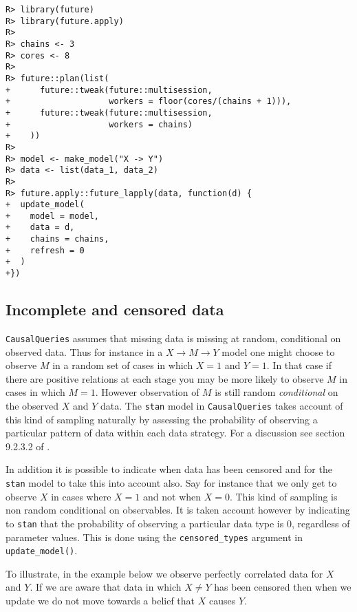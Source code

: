 \documentclass[
  11pt,
  article]{jss}
\begin{document}
\begin{verbatim}
R> library(future)
R> library(future.apply)
R> 
R> chains <- 3
R> cores <- 8
R> 
R> future::plan(list(
+      future::tweak(future::multisession, 
+                    workers = floor(cores/(chains + 1))),
+      future::tweak(future::multisession, 
+                    workers = chains)
+    ))
R> 
R> model <- make_model("X -> Y")
R> data <- list(data_1, data_2)
R> 
R> future.apply::future_lapply(data, function(d) {
+  update_model(
+    model = model,
+    data = d,
+    chains = chains,
+    refresh = 0
+  )
+})
\end{verbatim}

\hypertarget{incomplete-and-censored-data}{%
\subsection{Incomplete and censored
data}\label{incomplete-and-censored-data}}

\texttt{CausalQueries} assumes that missing data is missing at random,
conditional on observed data. Thus for instance in a
\(X \rightarrow M \rightarrow Y\) model one might choose to observe
\(M\) in a random set of cases in which \(X=1\) and \(Y=1\). In that
case if there are positive relations at each stage you may be more
likely to observe \(M\) in cases in which \(M=1\). However observation
of \(M\) is still random \emph{conditional} on the observed \(X\) and
\(Y\) data. The \texttt{stan} model in \texttt{CausalQueries} takes
account of this kind of sampling naturally by assessing the probability
of observing a particular pattern of data within each data strategy. For
a discussion see section 9.2.3.2 of \citet{ii2023}.

In addition it is possible to indicate when data has been censored and
for the \texttt{stan} model to take this into account also. Say for
instance that we only get to observe \(X\) in cases where \(X=1\) and
not when \(X=0\). This kind of sampling is non random conditional on
observables. It is taken account however by indicating to \texttt{stan}
that the probability of observing a particular data type is 0,
regardless of parameter values. This is done using the
\texttt{censored\_types} argument in \texttt{update\_model()}.

To illustrate, in the example below we observe perfectly correlated data
for \(X\) and \(Y\). If we are aware that data in which \(X \neq Y\) has
been censored then when we update we do not move towards a belief that
\(X\) causes \(Y\).
\end{document}
